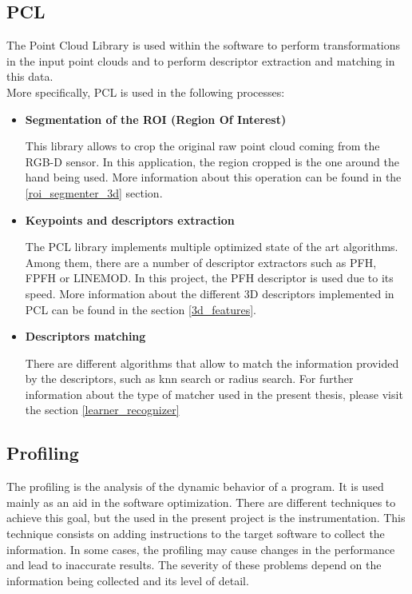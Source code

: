 	\subsection{PCL}
		\label{technologies_pcl}
		The Point Cloud Library is used within the software to perform transformations in the input point clouds and to perform descriptor extraction and matching in this data. 
		\\

		More specifically, PCL is used in the following processes: 

		\begin{itemize}
			\item{\textbf{Segmentation of the ROI (Region Of Interest)\\ }}

			This library allows to crop the original raw point cloud coming from the RGB-D sensor. In this application, the region cropped is the one around the hand being used. More information about this operation can be found in the \ref{roi_segmenter_3d} section. 
			

			\item{\textbf{ Keypoints and descriptors extraction\\ }}

			 The PCL library implements multiple optimized state of the art algorithms. Among them, there are a number of descriptor extractors such as PFH, FPFH or LINEMOD. In this project, the PFH descriptor is used due to its speed. More information about the different 3D descriptors implemented in PCL can be found in the section \ref{3d_features}.


			\item {\textbf{Descriptors matching\\ }}

			There are different algorithms that allow to match the information provided by the descriptors, such as knn search or radius search. For further information about the type of matcher used in the present thesis, please visit the section \ref{learner_recognizer}
		\end{itemize}

	\subsection{Profiling}
		\label{profiling}
		The profiling is the analysis of the dynamic behavior of a program. It is used mainly as an aid in the software optimization. There are different techniques to achieve this goal, but the used in the present project is the instrumentation. This technique consists on adding instructions to the target software to collect the information. In some cases, the profiling may cause changes in the performance and lead to inaccurate results. The severity of these problems depend on the information being collected and its level of detail. 
		\\

